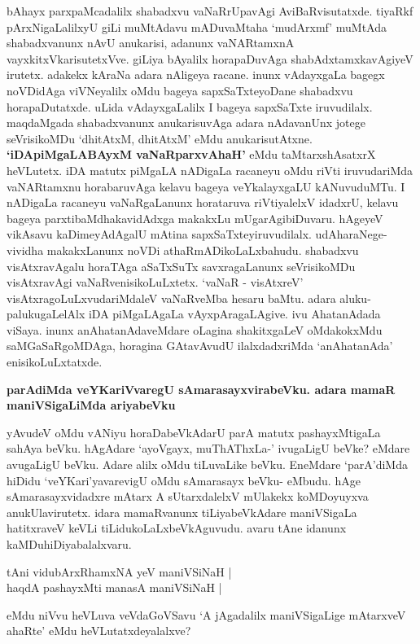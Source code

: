 \noindent
bAhayx parxpaMcadalilx shabadxvu vaNaRrUpavAgi AviBaRvisutatxde. tiyaRkf pArxNigaLalilxyU giLi muMtAdavu mADuvaMtaha `mudArxmf' muMtAda shabadxvanunx nAvU anukarisi, adanunx vaNARtamxnA vayxkitxVkarisutetxVve. giLiya bAyalilx horapaDuvAga shabAdxtamxkavAgiyeV irutetx. adakekx kAraNa adara nAligeya racane. inunx vAdayxgaLa bagegx noVDidAga viVNeyalilx oMdu bageya sapxSaTxteyoDane shabadxvu horapaDutatxde. uLida vAdayxgaLalilx I bageya sapxSaTxte iruvudilalx. maqdaMgada shabadxvanunx anukarisuvAga adara nAdavanUnx jotege seVrisikoMDu `dhitAtxM, dhitAtxM' eMdu anukarisutAtxne. {\bf `iDApiMgaLABAyxM vaNaRparxvAhaH'}\label{204} eMdu taMtarxshAsatxrX heVLutetx. iDA matutx piMgaLA nADigaLa racaneyu oMdu riVti iruvudariMda vaNARtamxnu horabaruvAga kelavu bageya veYkalayxgaLU kANuvuduMTu. I nADigaLa racaneyu vaNaRgaLanunx horataruva riVtiyalelxV idadxrU, kelavu bageya parxtibaMdhakavidAdxga makakxLu mUgarAgibiDuvaru. hAgeyeV vikAsavu kaDimeyAdAgalU mAtina sapxSaTxteyiruvudilalx. udAharaNege- vividha makakxLanunx noVDi athaRmADikoLaLxbahudu. shabadxvu visAtxravAgalu horaTAga aSaTxSuTx savxragaLanunx seVrisikoMDu visAtxravAgi vaNaRvenisikoLuLxtetx. `vaNaR - visAtxreV' visAtxragoLuLxvudariMdaleV vaNaRveMba hesaru baMtu. adara aluku-palukugaLelAlx iDA piMgaLAgaLa vAyxpAragaLAgive. ivu AhatanAdada viSaya. inunx anAhatanAdaveMdare oLagina shakitxgaLeV oMdakokxMdu saMGaSaRgoMDAga, horagina GAtavAvudU ilalxdadxriMda `anAhatanAda' enisikoLuLxtatxde.

{\bigskip
\noindent
{\large\bf parAdiMda veYKariVvaregU sAmarasayxvirabeVku. adara mamaR maniVSigaLiMda ariyabeVku}}\label{page204}
\medskip

\noindent
yAvudeV oMdu vANiyu horaDabeVkAdarU parA matutx pashayxMtigaLa sahAya beVku. hAgAdare `ayoVgayx, muThAThxLa-' ivugaLigU beVke? eMdare avugaLigU beVku. Adare alilx oMdu tiLuvaLike beVku. EneMdare `parA'diMda hiDidu `veYKari'yavarevigU oMdu sAmarasayx beVku- eMbudu. hAge sAmarasayxvidadxre mAtarx A sUtarxdalelxV mUlakekx koMDoyuyxva anukUlavirutetx. idara mamaRvanunx tiLiyabeVkAdare maniVSigaLa hatitxraveV keVLi tiLidukoLaLxbeVkAguvudu. avaru tAne idanunx kaMDuhiDiyabalalxvaru.

\begin{shloka}
tAni vidubArxRhamxNA yeV maniVSiNaH |\\\label{205}
haqdA pashayxMti manasA maniVSiNaH |\label{205a}
\end{shloka}

\noindent
eMdu niVvu heVLuva veVdaGoVSavu `A jAgadalilx maniVSigaLige mAtarxveV ahaRte' eMdu heVLutatxdeyalalxve?

